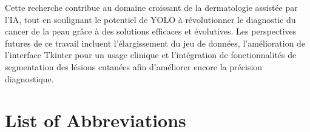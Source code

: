 \documentclass[a4paper,12pt]{report}
\begin{document}
\begin{spacing}{1.5}
    Cette recherche contribue au domaine croissant de la dermatologie assistée par l'IA, tout en soulignant le potentiel de YOLO à révolutionner le diagnostic du cancer de la peau grâce à des solutions efficaces et évolutives. Les perspectives futures de ce travail incluent l'élargissement du jeu de données, l'amélioration de l'interface Tkinter pour un usage clinique et l'intégration de fonctionnalités de segmentation des lésions cutanées afin d'améliorer encore la précision diagnostique.  

\tableofcontents
\listoffigures
\listoftables

\chapter*{List of Abbreviations}


\end{spacing}
\end{document}
